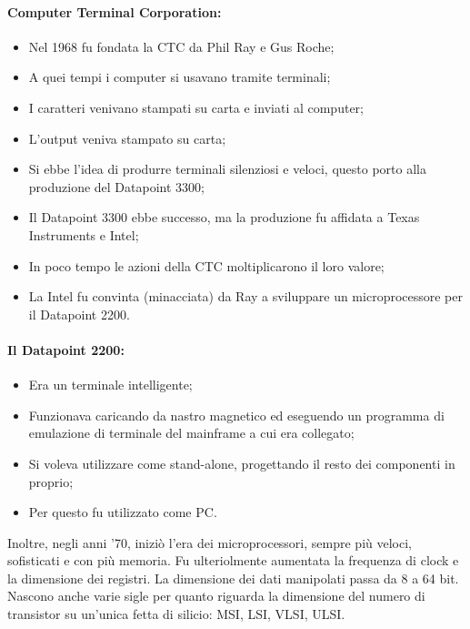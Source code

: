 \paragraph{Computer Terminal Corporation:} 

\begin{itemize}
    \item Nel 1968 fu fondata la CTC da Phil Ray e Gus Roche;
    \item A quei tempi i computer si usavano tramite terminali;
    \item I caratteri venivano stampati su carta e inviati al computer;
    \item L'output veniva stampato su carta;
    \item Si ebbe l'idea di produrre terminali silenziosi e veloci, 
    questo porto alla produzione del Datapoint 3300;
    \item Il Datapoint 3300 ebbe successo, ma la produzione fu affidata a
    Texas Instruments e Intel;
    \item In poco tempo le azioni della CTC moltiplicarono il loro valore;
    \item La Intel fu convinta (minacciata) da Ray a sviluppare un microprocessore
    per il Datapoint 2200.
\end{itemize}

\paragraph{Il Datapoint 2200:}

\begin{itemize}
    \item Era un terminale intelligente;
    \item Funzionava caricando da nastro magnetico ed eseguendo
    un programma di emulazione di terminale del mainframe a cui era collegato;
    \item Si voleva utilizzare come stand-alone, progettando il resto dei componenti
    in proprio;
    \item Per questo fu utilizzato come PC.
\end{itemize}

Inoltre, negli anni '70, iniziò l'era dei microprocessori, sempre più
veloci, sofisticati e con più memoria. Fu ulteriolmente aumentata la frequenza
di clock e la dimensione dei registri. La dimensione dei dati manipolati passa
da 8 a 64 bit. Nascono anche varie sigle per quanto riguarda la dimensione
del numero di transistor su un'unica fetta di silicio: MSI, LSI, VLSI, ULSI.

